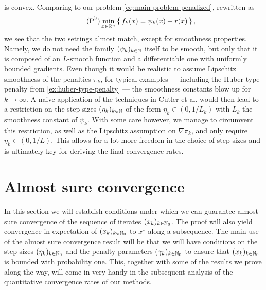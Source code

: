 is convex. Comparing to our problem \eqref{eq:main-problem-penalized},
rewritten as 
\begin{equation}
    \label{eq:main-problem-penalized-copy-with-psi}
    \tag{$\textnormal{P}^\textnormal{k}$}
    \min_{x\in\R^n}
    \left\{\, f_k(x) = \psi_k(x) + r(x) \,\right\},
\end{equation}
we see that the two settings almost match, except for smoothness properties. Namely,
we do not need the family $(\psi_k)_{k\in\mathbb{N}}$ itself to be smooth, but only that
it is composed of an $L$-smooth function and a differentiable one
with uniformly bounded gradients. Even though it would be realistic to
assume Lipschitz smoothness of the penalties $\pi_k$, for typical examples
--- including the Huber-type penalty from \cref{ex:huber-type-penalty} --- the
smoothness constants blow up for $k\to\infty$.
A naive application of the techniques in Cutler et al. \cite{cutler2023stochastic}
would then lead to a restriction on the step sizes $(\eta_k)_{k\in\mathbb{N}}$ of
the form $\eta_k \in (0, 1/L_k)$ with $L_k$ the smoothness constant of $\psi_k$.
With some care however, we manage to circumvent this restriction, as well as
the Lipschitz assumption on $\nabla \pi_k$, and only require $\eta_k\in(0, 1/L)$.
This allows for a lot more freedom in the choice of step sizes
and is ultimately key for deriving the final convergence rates.

\section{Almost sure convergence}
\label{sec:almost-sure-convergence}

In this section we will establish
conditions under which we can guarantee almost sure convergence of the sequence of iterates $(x_k)_{k\in\mathbb{N}_0}$.
The proof will also yield convergence in expectation of
$(x_k)_{k\in\mathbb{N}_0}$ to $x^\star$ along a subsequence. The main use of the almost sure convergence
result will be that we will have conditions on the step sizes $(\eta_k)_{k\in\mathbb{N}_0}$ and the
penalty parameters $(\gamma_k)_{k\in\mathbb{N}_0}$ to ensure that $(x_k)_{k\in\mathbb{N}_0}$ is bounded with
probability one. This, together with some of the results we prove along the way, will
come in very handy in the subsequent analysis of
the quantitative convergence rates of our methods.

